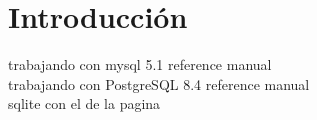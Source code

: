 \chapter{Introducción}
trabajando con mysql 5.1 reference manual\\

trabajando con PostgreSQL 8.4 reference manual\\

sqlite con el de la pagina\\

